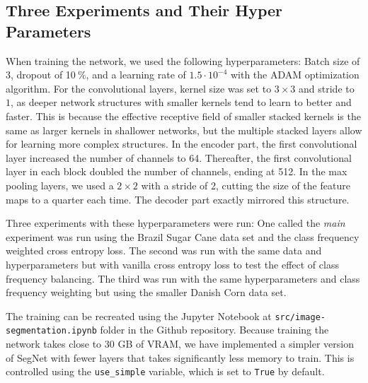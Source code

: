 \documentclass{article}
\newcommand{\pro}{\ensuremath{\ \%}}
\begin{document}
\subsection{Three Experiments and Their Hyper Parameters}
When training the network, we used the following hyperparameters: Batch size of 3, dropout of 10\pro, and a learning rate of $ 1.5\cdot 10^{-4} $ with the ADAM optimization algorithm.
For the convolutional layers, kernel size was set to $ 3\times 3 $ and stride to $ 1 $, as deeper network structures with smaller kernels tend to learn to better and faster.
This is because the effective receptive field of smaller stacked kernels is the same as larger kernels in shallower networks, but the multiple stacked layers allow for learning more complex structures.
In the encoder part, the first convolutional layer increased the number of channels to 64.
Thereafter, the first convolutional layer in each block doubled the number of channels, ending at 512.
In the max pooling layers, we used a $ 2\times 2 $ with a stride of 2, cutting the size of the feature maps to a quarter each time.
The decoder part exactly mirrored this structure.

Three experiments with these hyperparameters were run: One called the \textit{main} experiment was run using the Brazil Sugar Cane data set and the class frequency weighted cross entropy loss.  The second was run with the same data and hyperparameters but with vanilla cross entropy loss to test the effect of class frequency balancing. The third was run with the same hyperparameters and class frequency weighting but using the smaller Danish Corn data set.

The training can be recreated using the Jupyter Notebook at \texttt{src/image-segmentation.ipynb} folder in the Github repository.
Because training the network takes close to 30 GB of VRAM, we have implemented a simpler version of SegNet with fewer layers that takes significantly less memory to train.
This is controlled using the \texttt{use\_simple} variable, which is set to \texttt{True} by default.
\end{document}
